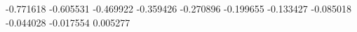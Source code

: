 -0.771618
-0.605531
-0.469922
-0.359426
-0.270896
-0.199655
-0.133427
-0.085018
-0.044028
-0.017554
0.005277
